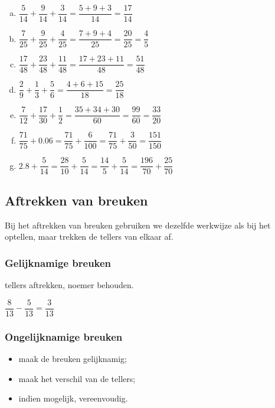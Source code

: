 \documentclass[12pt]{article}
\begin{document}
\begin{solution}
  \begin{enumerate}[(a)]
    \item $\dfrac{5}{14}+\dfrac{9}{14}+\dfrac{3}{14}=\dfrac{5+9+3}{14}=\dfrac{17}{14}$
    \item $\dfrac{7}{25}+\dfrac{9}{25}+\dfrac{4}{25}=\dfrac{7+9+4}{25}=\dfrac{20}{25}=\dfrac{4}{5}$
    \item $\dfrac{17}{48}+\dfrac{23}{48}+\dfrac{11}{48}=\dfrac{17+23+11}{48}=\dfrac{51}{48}$
    \item $\dfrac{2}{9}+\dfrac{1}{3}+\dfrac{5}{6}=\dfrac{4+6+15}{18}=\dfrac{25}{18}$
    \item $\dfrac{7}{12}+\dfrac{17}{30}+\dfrac{1}{2}=\dfrac{35+34+30}{60}=\dfrac{99}{60}=\dfrac{33}{20}$
    \item $\dfrac{71}{75}+0.06=\dfrac{71}{75}+\dfrac{6}{100}=\dfrac{71}{75}+\dfrac{3}{50}=\dfrac{151}{150}$
    \item $2.8+\dfrac{5}{14}=\dfrac{28}{10}+\dfrac{5}{14}=\dfrac{14}{5}+\dfrac{5}{14}=\dfrac{196}{70}+\dfrac{25}{70}$
  \end{enumerate}
\end{solution}

\subsection{Aftrekken van breuken}

Bij het aftrekken van breuken gebruiken we dezelfde werkwijze als bij het optellen, maar trekken de tellers van elkaar af.

\subsubsection{Gelijknamige breuken}

tellers aftrekken, noemer behouden.

\begin{voorbeeld}
$\dfrac{8}{13}-\dfrac{5}{13}=\dfrac{3}{13}$
\end{voorbeeld}


\subsubsection{Ongelijknamige breuken}

\begin{itemize}
  \item maak de breuken gelijknamig;
  \item maak het verschil van de tellers;
  \item indien mogelijk, vereenvoudig.
\end{itemize}
\end{document}
